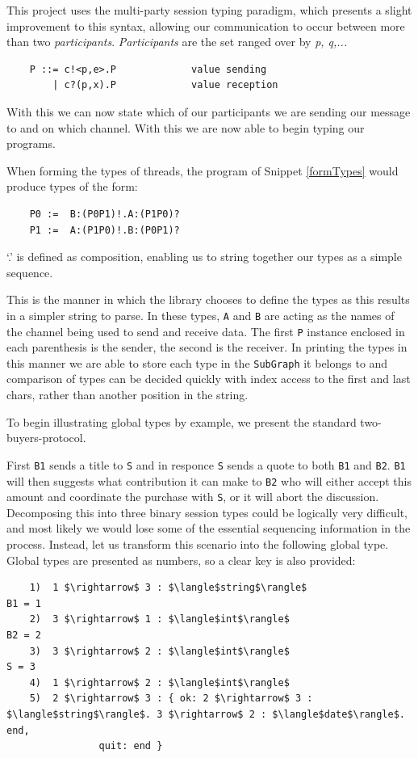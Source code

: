 \documentclass[11pt, abstracton, twoside, titlepage=true]{scrartcl}
\begin{document}
This project uses the multi-party session typing paradigm, which presents a slight
improvement to this syntax, allowing our communication to occur between more
than two \emph{participants}. \emph{Participants} are the set ranged over by 
\emph{p, q,...}
\\
\begin{lstlisting}
    P ::= c!<p,e>.P             value sending
        | c?(p,x).P             value reception
\end{lstlisting}

With this we can now state which of our participants we are sending our message
to and on which channel. With this we are now able to begin typing our programs.

When forming the types of threads, the program of Snippet \ref{formTypes}
would produce types of the form:
\\
\begin{lstlisting}
    P0 :=  B:(P0P1)!.A:(P1P0)?
    P1 :=  A:(P1P0)!.B:(P0P1)?
\end{lstlisting}

`.' is defined as composition, enabling us to string together our types as
a simple sequence.

This is the manner in which the library chooses to define the types as this
results in a simpler string to parse. In these types, \texttt{A} and \texttt{B} 
are acting as the names of the channel being used to send and receive data.
The first \texttt{P} instance enclosed in each parenthesis is the sender, the 
second is the receiver. In printing the types in this manner we are able to 
store each type in the \texttt{SubGraph} it belongs to and comparison of types
can be decided quickly with index access to the first and last chars, rather than
another position in the string.

To begin illustrating global types by example, we present the standard 
two-buyers-protocol.

First \texttt{B1} sends a title to \texttt{S} and in responce \texttt{S}
sends a quote to both \texttt{B1} and \texttt{B2}. \texttt{B1} will then
suggests what contribution it can make to \texttt{B2} who will either
accept this amount and coordinate the purchase with \texttt{S}, or it will
abort the discussion. Decomposing this into three binary session types
could be logically very difficult, and most likely we would lose some of
the essential sequencing information in the process. Instead, let us transform
this scenario into the following global type. Global types are presented as
numbers, so a clear key is also provided:
\\
\begin{lstlisting}
    1)  1 $\rightarrow$ 3 : $\langle$string$\rangle$                         B1 = 1
    2)  3 $\rightarrow$ 1 : $\langle$int$\rangle$                            B2 = 2
    3)  3 $\rightarrow$ 2 : $\langle$int$\rangle$                             S = 3
    4)  1 $\rightarrow$ 2 : $\langle$int$\rangle$
    5)  2 $\rightarrow$ 3 : { ok: 2 $\rightarrow$ 3 : $\langle$string$\rangle$. 3 $\rightarrow$ 2 : $\langle$date$\rangle$. end,
                quit: end }
\end{lstlisting}
\end{document}
